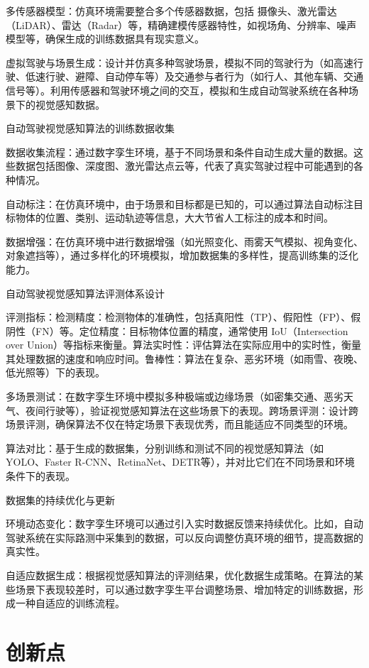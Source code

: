 多传感器模型：仿真环境需要整合多个传感器数据，包括 摄像头、激光雷达（LiDAR）、雷达（Radar）等，精确建模传感器特性，如视场角、分辨率、噪声模型等，确保生成的训练数据具有现实意义。

虚拟驾驶与场景生成：设计并仿真多种驾驶场景，模拟不同的驾驶行为（如高速行驶、低速行驶、避障、自动停车等）及交通参与者行为（如行人、其他车辆、交通信号等）。利用传感器和驾驶环境之间的交互，模拟和生成自动驾驶系统在各种场景下的视觉感知数据。

自动驾驶视觉感知算法的训练数据收集

数据收集流程：通过数字孪生环境，基于不同场景和条件自动生成大量的数据。这些数据包括图像、深度图、激光雷达点云等，代表了真实驾驶过程中可能遇到的各种情况。

自动标注：在仿真环境中，由于场景和目标都是已知的，可以通过算法自动标注目标物体的位置、类别、运动轨迹等信息，大大节省人工标注的成本和时间。

数据增强：在仿真环境中进行数据增强（如光照变化、雨雾天气模拟、视角变化、对象遮挡等），通过多样化的环境模拟，增加数据集的多样性，提高训练集的泛化能力。

自动驾驶视觉感知算法评测体系设计

评测指标：检测精度：检测物体的准确性，包括真阳性（TP）、假阳性（FP）、假阴性（FN）等。定位精度：目标物体位置的精度，通常使用 IoU（Intersection over Union）等指标来衡量。算法实时性：评估算法在实际应用中的实时性，衡量其处理数据的速度和响应时间。鲁棒性：算法在复杂、恶劣环境（如雨雪、夜晚、低光照等）下的表现。

多场景测试：在数字孪生环境中模拟多种极端或边缘场景（如密集交通、恶劣天气、夜间行驶等），验证视觉感知算法在这些场景下的表现。跨场景评测：设计跨场景评测，确保算法不仅在特定场景下表现优秀，而且能适应不同类型的环境。

算法对比：基于生成的数据集，分别训练和测试不同的视觉感知算法（如 YOLO、Faster R-CNN、RetinaNet、DETR等），并对比它们在不同场景和环境条件下的表现。

数据集的持续优化与更新

环境动态变化：数字孪生环境可以通过引入实时数据反馈来持续优化。比如，自动驾驶系统在实际路测中采集到的数据，可以反向调整仿真环境的细节，提高数据的真实性。

自适应数据生成：根据视觉感知算法的评测结果，优化数据生成策略。在算法的某些场景下表现较差时，可以通过数字孪生平台调整场景、增加特定的训练数据，形成一种自适应的训练流程。



\section{创新点}

